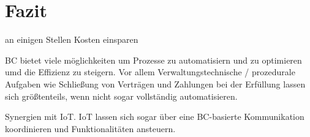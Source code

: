 \section{Fazit}

an einigen Stellen Kosten einsparen

BC bietet viele möglichkeiten um Prozesse zu automatisiern und zu optimieren umd die Effizienz zu steigern.
Vor allem Verwaltungstechnische / prozedurale Aufgaben wie Schließung von Verträgen und Zahlungen bei der
Erfüllung lassen sich größtenteils, wenn nicht sogar vollständig automatisieren.


Synergien mit IoT. IoT lassen sich sogar über eine BC-basierte Kommunikation koordinieren 
und Funktionalitäten ansteuern.